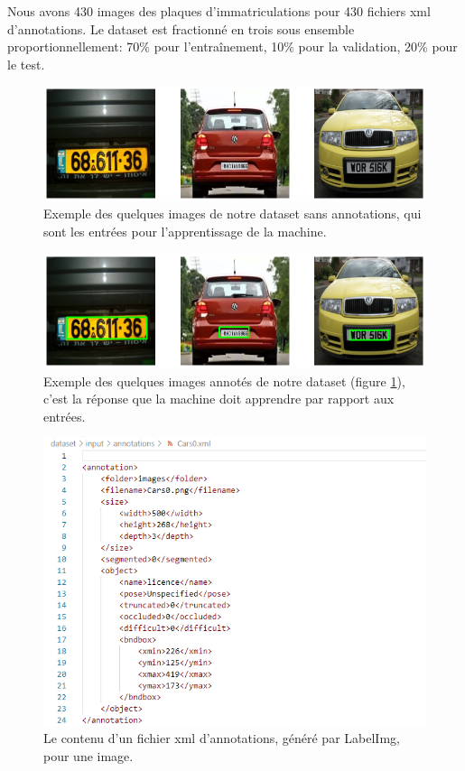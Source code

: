 	Nous avons 430 images des plaques d’immatriculations pour 430 fichiers xml d’annotations.
	Le dataset est fractionné en trois sous ensemble proportionnellement: 70\% pour l'entraînement, 10\% pour la validation, 20\% pour le test.
	
	
	\begin{figure}[H]%
		\centering
		\includegraphics[width=\textwidth]{images/dataset_img6}
		\caption{Exemple des quelques images de notre dataset sans annotations, qui sont les entrées pour l’apprentissage de la machine.}
		\label{fig:image_without_annotations}
	\end{figure}
	
	\begin{figure}[H]%
		\centering
		\includegraphics[width=\textwidth]{images/dataset_annated}
		\caption{Exemple des quelques images annotés de notre dataset (figure \ref{fig:image_without_annotations}), c’est la réponse que la machine doit apprendre par rapport aux entrées.}
		\label{fig:image_annotations}
	\end{figure}

	\begin{figure}[H]%
		\centering
		\includegraphics[width=\textwidth]{images/xml_annotation}
		\caption{Le contenu d'un fichier xml d'annotations, généré par LabelImg, pour une image. }
		\label{fig:xml_annotation}
	\end{figure}



